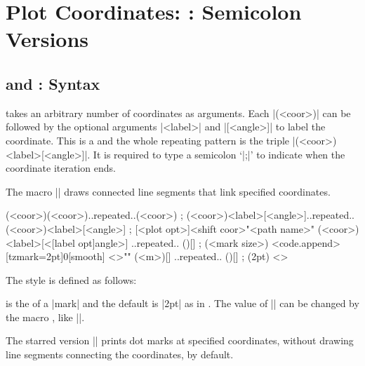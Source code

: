 \chapter{Plot Coordinates: \protect\cmd{\tzplot}: Semicolon Versions}
\label{c:plotcoordinates}

\section{\protect\cmd{\tzplot} and \protect\cmd{\tzplot*}: Syntax}
\label{s:tzplot}

\icmd{\tzplot} takes an arbitrary number of coordinates as arguments.
Each |(<coor>)| can be followed by the optional arguments |{<label>}| and |[<angle>]| to label the coordinate. This is a  and the whole repeating pattern is the triple |(<coor>){<label>}[<angle>]|. It is required to type a semicolon `|;|' to indicate when the coordinate iteration ends.

The macro |\tzplot| draws connected line segments that link specified coordinates.

\begin{tzdef}{}
\tzplot(<coor>)(<coor>)..repeated..(<coor>) ;
\tzplot(<coor>){<label>}[<angle>]..repeated..(<coor>){<label>}[<angle>] ;
 [<plot opt>]<shift coor>"<path name>"
       (<coor>){<label>}[<[label opt]angle>] 
       ..repeated.. 
       (){}[] ; (<mark size>) <code.append>
  [tzmark=2pt]{0}[smooth]  <>"" (<m>){}[] ..repeated.. (){}[] ; (2pt) <>
\end{tzdef}

The style  is defined as follows:

\begin{tzsty}{}
\end{tzsty}

\icmd{\tzmarksize} is the  of a |mark| and the default is |2pt| as in \Tikz.
The value of |\tzmarksize| can be changed by the macro \icmd{\settzmarksize}, like |\settzmarksize{3pt}|.


The starred version |\tzplot*| prints dot marks at specified coordinates, without drawing line segments connecting the coordinates, by default.



